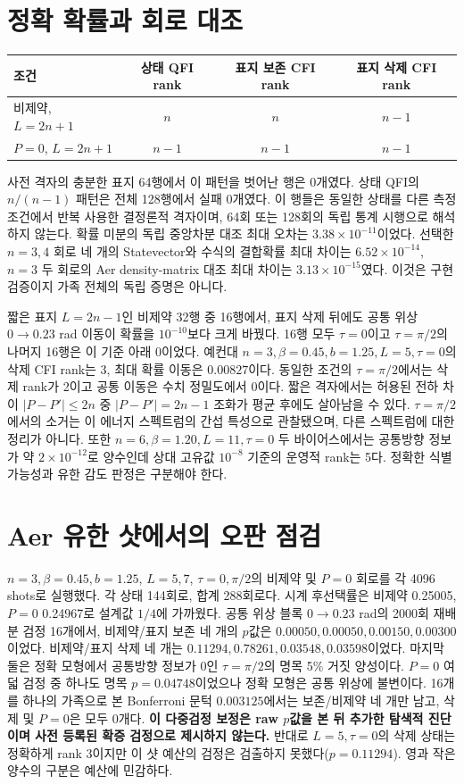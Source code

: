 \documentclass[11pt,a4paper]{article}
\begin{document}
\section{정확 확률과 회로 대조}
\begin{center}
\begin{tabular}{@{}lccc@{}}
\toprule
조건 & 상태 QFI rank & 표지 보존 CFI rank & 표지 삭제 CFI rank \\
\midrule
비제약, $L=2n+1$ & $n$ & $n$ & $n-1$ \\
$P=0$, $L=2n+1$ & $n-1$ & $n-1$ & $n-1$ \\
\bottomrule
\end{tabular}
\end{center}
사전 격자의 충분한 표지 64행에서 이 패턴을 벗어난 행은 0개였다.
상태 QFI의 $n/(n-1)$ 패턴은 전체 128행에서 실패 0개였다.
이 행들은 동일한 상태를 다른 측정 조건에서 반복 사용한 결정론적 격자이며,
64회 또는 128회의 독립 통계 시행으로 해석하지 않는다.
확률 미분의 독립 중앙차분 대조 최대 오차는 $3.38\times10^{-11}$이었다.
선택한 $n=3,4$ 회로 네 개의 Statevector와 수식의 결합확률 최대 차이는
$6.52\times10^{-14}$, $n=3$ 두 회로의 Aer density-matrix 대조 최대 차이는
$3.13\times10^{-15}$였다. 이것은 구현 검증이지 가족 전체의 독립 증명은 아니다.

짧은 표지 $L=2n-1$인 비제약 32행 중 16행에서, 표지 삭제 뒤에도 공통 위상
$0\to0.23$ rad 이동이 확률을 $10^{-10}$보다 크게 바꿨다. 16행 모두
$\tau=0$이고 $\tau=\pi/2$의 나머지 16행은 이 기준 아래 0이었다.
예컨대 $n=3,\beta=0.45,b=1.25,L=5,\tau=0$의 삭제 CFI rank는 3,
최대 확률 이동은 $0.00827$이다. 동일한 조건의 $\tau=\pi/2$에서는 삭제
rank가 2이고 공통 이동은 수치 정밀도에서 0이다.
짧은 격자에서는 허용된 전하 차이 $|P-P'|\le2n$ 중
$|P-P'|=2n-1$ 조화가 평균 후에도 살아남을 수 있다.
$\tau=\pi/2$에서의 소거는 이 에너지 스펙트럼의 간섭 특성으로 관찰됐으며,
다른 스펙트럼에 대한 정리가 아니다.
또한 $n=6,\beta=1.20,L=11,\tau=0$ 두 바이어스에서는
공통방향 정보가 약 $2\times10^{-12}$로 양수인데 상대 고유값
$10^{-8}$ 기준의 운영적 rank는 5다. 정확한 식별 가능성과 유한 감도
판정은 구분해야 한다.

\section{Aer 유한 샷에서의 오판 점검}
$n=3,\beta=0.45,b=1.25$, $L=5,7$, $\tau=0,\pi/2$의 비제약 및
$P=0$ 회로를 각 4096 shots로 실행했다. 각 상태 144회로, 합계 288회로다.
시계 후선택률은 비제약 0.25005, $P=0$ 0.24967로 설계값 $1/4$에 가까웠다.
공통 위상 블록 $0\to0.23$ rad의 2000회 재배분 검정 16개에서,
비제약/표지 보존 네 개의 $p$값은 $0.00050,0.00050,0.00150,0.00300$이었다.
비제약/표지 삭제 네 개는 $0.11294,0.78261,0.03548,0.03598$이었다.
마지막 둘은 정확 모형에서 공통방향 정보가 0인 $\tau=\pi/2$의
명목 5\% 거짓 양성이다. $P=0$ 여덟 검정 중 하나도 명목
$p=0.04748$이었으나 정확 모형은 공통 위상에 불변이다.
16개를 하나의 가족으로 본 Bonferroni 문턱 $0.003125$에서는
보존/비제약 네 개만 남고, 삭제 및 $P=0$은 모두 0개다.
\textbf{이 다중검정 보정은 raw $p$값을 본 뒤 추가한 탐색적 진단이며
사전 등록된 확증 검정으로 제시하지 않는다.}
반대로 $L=5,\tau=0$의 삭제 상태는 정확하게 rank 3이지만 이 샷 예산의
검정은 검출하지 못했다($p=0.11294$). 영과 작은 양수의 구분은 예산에
민감하다.
\end{document}
